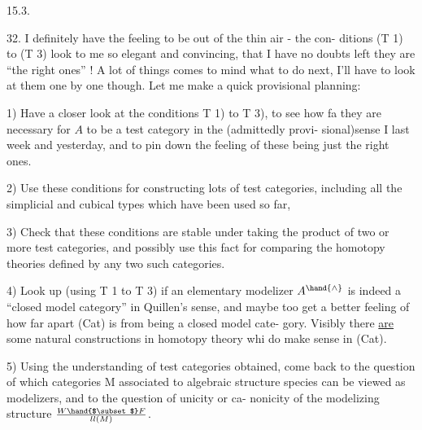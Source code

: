 
15.3.

32.   I definitely have the feeling to be out of the thin air  -  the con-%
ditions  (T 1) to (T 3) look to me so elegant and convincing,  that I have
no doubts left they are ``the right ones'' !  A lot of things comes to mind
what to do next,  I'll have to look at them one by one though. Let me make
a quick provisional planning:

1)  Have a closer look at the conditions  T 1) to  T 3),  to see how fa
they are necessary for  $A$ to be a test category in the (admittedly provi-%
sional)sense\xout{\unsure{;}} I  last week and yesterday,  and to pin down
the feeling of these being just the right ones.

2)  Use these conditions for constructing lots of test categories,
including all the simplicial and cubical types which have been used so far,

3)  Check that these conditions are stable under taking the product of
two or more test categories,  and possibly use this fact for comparing
the homotopy theories defined by any two such categories.

4)  Look up  (using T 1 to T 3) if an elementary  modelizer $A^{\hand{\wedge}}$
is indeed a ``closed model category'' in Quillen's sense,  and maybe too get
a better feeling of how far apart (Cat) is from being a closed model cate-%
gory. Visibly there \uline{are} some natural constructions in homotopy theory whi
do make sense in (Cat).

5)  Using the understanding of test categories obtained,  come back to
the question of which categories M associated to  algebraic structure
species can be viewed as modelizers,  and to the question of unicity or ca-%
nonicity of the modelizing structure $W\hand{$\subset$}F\over{l}{l}(M)$.

